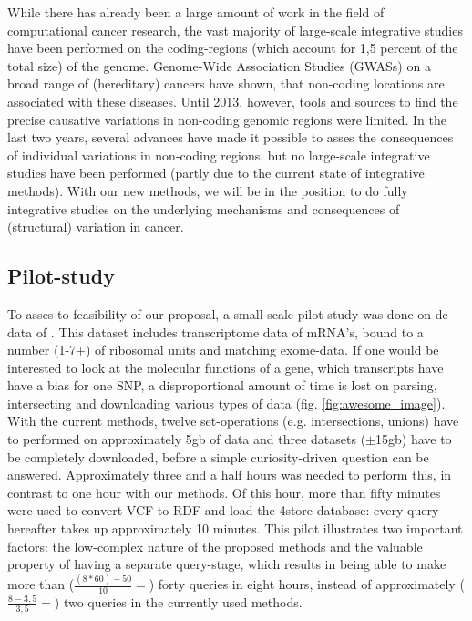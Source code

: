 \documentclass[twoside,fontsize=10pt]{article}
\begin{document}
\noindent
While there has already been a large amount of work in the field of computational cancer research, the vast majority of large-scale integrative studies have been performed on the coding-regions (which account for 1,5 percent of the total size) of the genome\cite{ENCODE}. Genome-Wide Association Studies (GWASs) on a broad range of (hereditary) cancers have shown, that non-coding locations are associated with these diseases. Until 2013, however, tools and sources to find the precise causative variations in non-coding genomic regions were limited. In the last two years, several advances have made it possible to asses the consequences of individual variations in non-coding regions\cite{Ongen2014,Khurana2013}, but no large-scale integrative studies have been performed (partly due to the current state of integrative methods). With our new methods, we will be in the position to do fully integrative studies on the underlying mechanisms and consequences of (structural) variation in cancer.

\subsection*{Pilot-study}
To asses to feasibility of our proposal, a small-scale pilot-study was done on de data of \citet{VanHeesch2014}. This dataset includes transcriptome data of mRNA's, bound to a number (1-7+) of ribosomal units and matching exome-data. If one would be interested to look at the molecular functions of a gene, which transcripts have have a bias for one SNP, a disproportional amount of time is lost on parsing, intersecting and downloading various types of data (fig. \ref{fig:awesome_image}). With the current methods, twelve set-operations (e.g. intersections, unions) have to performed on approximately 5gb of data and three datasets ($\pm$15gb) have to be completely downloaded, before a simple curiosity-driven question can be answered. Approximately three and a half hours was needed to perform this, in contrast to one hour with our methods. Of this hour, more than fifty minutes were used to convert VCF to RDF and load the 4store database: every query hereafter takes up approximately 10 minutes. This pilot illustrates two important factors: the low-complex nature of the proposed methods and the valuable property of having a separate query-stage, which results in being able to make more than ($\frac{(8*60)-50}{10}= $) forty queries in eight hours, instead of approximately ($\frac{8-3,5}{3,5}= $) two queries in the currently used methods.
\end{document}
